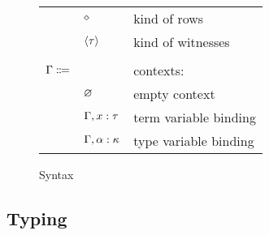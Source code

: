 \begin{figure}[H]
\begin{center}
\begin{tabular}{l l l}
          & $\diamond$ & kind of rows \\
          & $\left\langle \tau \right\rangle$ & kind of witnesses \\
          \\
          $\Gamma \Coloneqq$ & & contexts: \\
          & $\varnothing$ & empty context \\
          & $\Gamma, x : \tau$ & term variable binding \\
          & $\Gamma, \alpha : \kappa$ & type variable binding \\
        \end{tabular}
      \end{center}

      \caption{Syntax}\label{fig:entanglement_syntax}
    \end{figure}

  \subsection{Typing}

